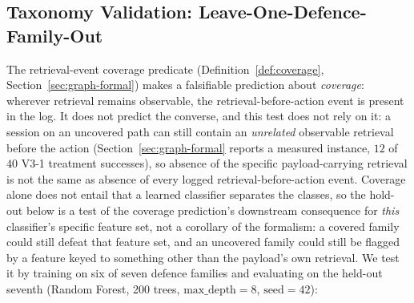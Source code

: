 \documentclass{article}
\begin{document}
\subsection{Taxonomy Validation: Leave-One-Defence-Family-Out}
\label{sec:taxonomy-validation}

The retrieval-event coverage predicate (Definition~\ref{def:coverage}, Section~\ref{sec:graph-formal}) makes a falsifiable prediction about \emph{coverage}: wherever retrieval remains observable, the retrieval-before-action event is present in the log. It does not predict the converse, and this test does not rely on it: a session on an uncovered path can still contain an \emph{unrelated} observable retrieval before the action (Section~\ref{sec:graph-formal} reports a measured instance, $12$ of $40$ V3-1 treatment successes), so absence of the specific payload-carrying retrieval is not the same as absence of every logged retrieval-before-action event. Coverage alone does not entail that a learned classifier separates the classes, so the hold-out below is a test of the coverage prediction's downstream consequence for \emph{this} classifier's specific feature set, not a corollary of the formalism: a covered family could still defeat that feature set, and an uncovered family could still be flagged by a feature keyed to something other than the payload's own retrieval. We test it by training on six of seven defence families and evaluating on the held-out seventh (Random Forest, 200 trees, $\text{max\_depth}{=}8$, $\text{seed}{=}42$):
\end{document}
